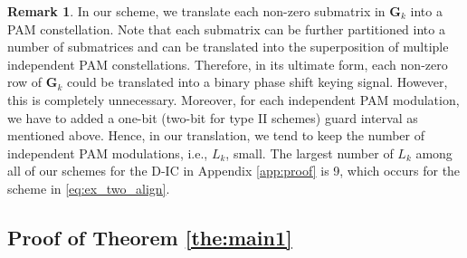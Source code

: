 \documentclass[12pt, draftclsnofoot, onecolumn]{IEEEtran}
\theoremstyle{definition}
\newtheorem{remark}{Remark}
\begin{document}
\begin{remark}\label{remark_bound_lk}
In our scheme, we translate each non-zero submatrix in $\boldsymbol{G}_k$ into a PAM constellation. Note that each submatrix can be further partitioned into a number of submatrices and can be translated into the superposition of multiple independent PAM constellations. Therefore, in its ultimate form, each non-zero row of $\boldsymbol{G}_k$ could be translated into a binary phase shift keying signal. However, this is completely unnecessary. Moreover, for each independent PAM modulation, we have to added a one-bit (two-bit for type II schemes) guard interval as mentioned above. Hence, in our translation, we tend to keep the number of independent PAM modulations, i.e., $L_k$, small. The largest number of $L_k$ among all of our schemes for the D-IC in Appendix \ref{app:proof} is 9, which occurs for the scheme in \eqref{eq:ex_two_align}.
\end{remark}




\subsection{Proof of Theorem \ref{the:main1}}\label{sec:proof_the2}
\end{document}
